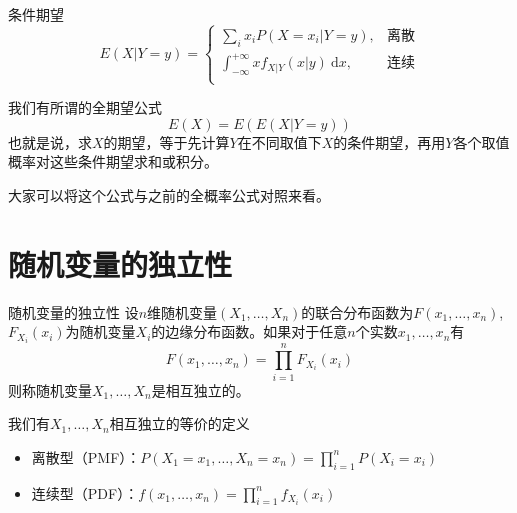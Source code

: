 
\begin{frame}

\begin{block}{条件期望}
\[E(X|Y=y) = \begin{cases}
\sum\limits_i x_i P(X=x_i | Y=y), & \text{离散} \\
\int_{-\infty}^{+\infty} x f_{X|Y}(x|y) ~ \mathrm{d}x, & \text{连续} \\
\end{cases}\]

\vspace{1em}
\pause

我们有所谓的全期望公式
\[E(X) = E(E(X | Y=y))\]
也就是说，求$X$的期望，等于先计算$Y$在不同取值下$X$的条件期望，再用$Y$各个取值概率对这些条件期望求和或积分。

大家可以将这个公式与之前的全概率公式对照来看。
\end{block}

\end{frame}


\section{随机变量的独立性}


\begin{frame}

\begin{block}{随机变量的独立性}
设$n$维随机变量$(X_1,\ldots,X_n)$的联合分布函数为$F(x_1,\ldots,x_n)$, $F_{X_i}(x_i)$为随机变量$X_i$的边缘分布函数。如果对于任意$n$个实数$x_1,\ldots,x_n$有
\[F(x_1,\ldots,x_n) = \prod\limits_{i=1}^n F_{X_i}(x_i)\]
则称随机变量$X_1,\ldots,X_n$是相互独立的。

\vspace{2em}
\pause

我们有$X_1,\ldots,X_n$相互独立的等价的定义
\begin{itemize}
\item 离散型（PMF）：$P(X_1=x_1,\ldots,X_n=x_n) = \prod\limits_{i=1}^n P(X_i=x_i)$
\item 连续型（PDF）：$f(x_1,\ldots,x_n) = \prod\limits_{i=1}^n f_{X_i}(x_i)$
\end{itemize}
\end{block}

\end{frame}

